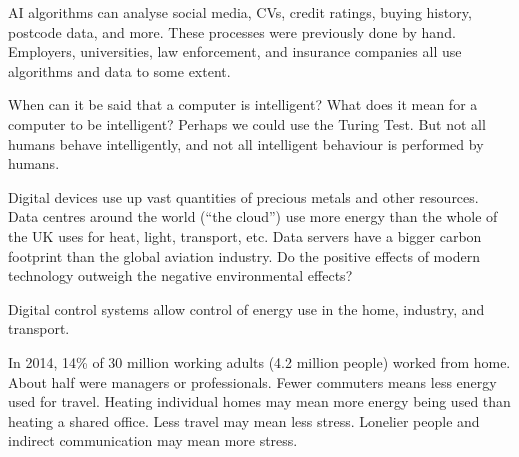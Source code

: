 \documentclass[../main.tex]{subfile}
\begin{document}
AI algorithms can analyse social media, CVs, credit ratings, buying history, postcode data, and more. These processes were previously done by hand. Employers, universities, law enforcement, and insurance companies all use algorithms and data to some extent.

When can it be said that a computer is intelligent? What does it mean for a computer to be intelligent? Perhaps we could use the Turing Test. But not all humans behave intelligently, and not all intelligent behaviour is performed by humans.


Digital devices use up vast quantities of precious metals and other resources. Data centres around the world (\enquote{the cloud}) use more energy than the whole of the UK uses for heat, light, transport, etc. Data servers have a bigger carbon footprint than the global aviation industry. Do the positive effects of modern technology outweigh the negative environmental effects?

Digital control systems allow control of energy use in the home, industry, and transport.

In 2014, 14\% of 30 million working adults (4.2 million people) worked from home. About half were managers or professionals. Fewer commuters means less energy used for travel. Heating individual homes may mean more energy being used than heating a shared office. Less travel may mean less stress. Lonelier people and indirect communication may mean more stress.
\end{document}
